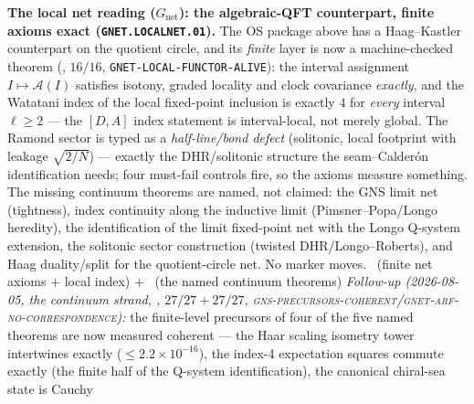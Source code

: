 \documentclass[11pt,a4paper]{article}
\theoremstyle{definition}
\begin{document}
\begin{center}
\end{center}

\noindent\textbf{The local net reading ($G_{\mathrm{net}}$): the
algebraic-QFT counterpart, finite axioms exact
(\texttt{GNET.LOCALNET.01}).}  The OS package above has a
Haag--Kastler counterpart on the quotient circle, and its
\emph{finite} layer is now a machine-checked theorem
(, $16/16$,
\texttt{GNET-LOCAL-FUNCTOR-ALIVE}): the interval assignment
$I\mapsto\mathcal A(I)$ satisfies isotony, graded locality and
clock covariance \emph{exactly}, and the Watatani index of the
local fixed-point inclusion is exactly $4$ for \emph{every}
interval $\ell\ge2$ --- the $[D,A]$ index statement is
interval-local, not merely global.  The Ramond sector is typed as a
\emph{half-line/bond defect} (solitonic, local footprint with
leakage $\sqrt{2/N}$) --- exactly the DHR/solitonic structure the
seam--Calder\'on identification needs; four must-fail controls fire,
so the axioms measure something.  The missing continuum theorems
are named, not claimed: the GNS limit net (tightness), index
continuity along the inductive limit (Pimsner--Popa/Longo
heredity), the identification of the limit fixed-point net with the
Longo Q-system extension, the solitonic sector construction
(twisted DHR/Longo--Roberts), and Haag duality/split for the
quotient-circle net.  No marker moves. \mE\ (finite net axioms $+$
local index) $+$ \mC\ (the named continuum theorems)
\emph{Follow-up (2026-08-05, the continuum strand,
, $27/27+27/27$,
\textsc{gns-precursors-coherent}/\textsc{gnet-arf-no-correspondence}):}
the finite-level precursors of four of the five named theorems are
now measured coherent --- the Haar scaling isometry tower
intertwines exactly ($\le2.2\times10^{-16}$), the index-4
expectation squares commute exactly (the finite half of the
Q-system identification), the canonical chiral-sea state is Cauchy
\end{document}
